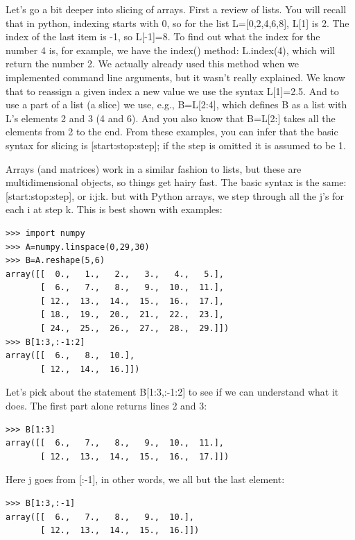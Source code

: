 \documentclass[11pt]{book}
\begin{document}
{{Let's go a bit deeper into slicing of arrays.  First a review of lists.   You will recall that in  python, indexing starts with 0, so for the list {\color{blue} L=[0,2,4,6,8], L[1]} is 2. The index of the last item is -1, so  {\color{blue}L[-1]}=8.  To find out what the index for the number 4 is, for example, we have the {\color{blue}index()} method:  {\color{blue}L.index(4}), which will return the number 2. We actually already used this method when we implemented command line arguments, but it wasn't really explained.   We know that to reassign a given index a new value we use the syntax {\color{blue}L[1]=2.5}.
And to use a part of a list (a slice) we use, e.g.,    {\color{blue}B=L[2:4]}, which  defines  {\color{blue}B} as a list with  {\color{blue}L}'s elements 2 and 3 (4 and 6).  And you also know that  {\color{blue}B=L[2:]} takes all the elements from 2 to the end.
From these examples, you can infer that the basic syntax for slicing is  {\color{blue}[start:stop:step]}; if the step is omitted it is assumed to be 1.

Arrays (and matrices) work in a similar fashion to lists, but these are multidimensional objects, so things get hairy fast.
The basic syntax is the same:  {\color{blue}[start:stop:step]},  or  {\color{blue}i:j:k}.   but with Python arrays, we step through all the  {\color{blue}j}'s for each  {\color{blue}i}  at step  {\color{blue}k}.  This is best shown with examples:


{ \color{blue} \begin{verbatim}
>>> import numpy
>>> A=numpy.linspace(0,29,30)
>>> B=A.reshape(5,6)
array([[  0.,   1.,   2.,   3.,   4.,   5.],
       [  6.,   7.,   8.,   9.,  10.,  11.],
       [ 12.,  13.,  14.,  15.,  16.,  17.],
       [ 18.,  19.,  20.,  21.,  22.,  23.],
       [ 24.,  25.,  26.,  27.,  28.,  29.]])
>>> B[1:3,:-1:2]
array([[  6.,   8.,  10.],
       [ 12.,  14.,  16.]])
\end{verbatim}}

Let's pick about the statement {\color{blue}B[1:3,:-1:2]} to see if we can understand what it does.  The first part alone returns lines 2 and 3:
{ \color{blue} \begin{verbatim}
>>> B[1:3]
array([[  6.,   7.,   8.,   9.,  10.,  11.],
       [ 12.,  13.,  14.,  15.,  16.,  17.]])
\end{verbatim}}

Here  {\color{blue}j} goes from [:-1], in other words, we all but the last element:

{ \color{blue} \begin{verbatim}
>>> B[1:3,:-1]
array([[  6.,   7.,   8.,   9.,  10.],
       [ 12.,  13.,  14.,  15.,  16.]])
\end{verbatim}}

}}
\end{document}
